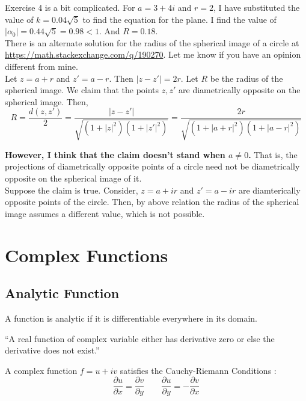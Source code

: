 \begin{commentary}
	Exercise 4 is a bit complicated.
	For $a = 3+4i$ and $r = 2$, I have substituted the value of $k = 0.04\sqrt{5}$ to find the equation for the plane.
	I find the value of $|\alpha_0| = 0.44\sqrt{5} = 0.98 < 1$.
	And $R = 0.18$. \\

	There is an alternate solution for the radius of the spherical image of a circle at \url{https://math.stackexchange.com/q/190270}.
	Let me know if you have an opinion different from mine.\\

	Let $z = a+r$ and $z' = a-r$.
	Then $|z-z'| = 2r$.
	Let $R$ be the radius of the spherical image.
	We claim that the points $z,z'$ are diametrically opposite on the spherical image.
	Then,
	\[ R = \frac{d(z,z')}{2} = \frac{|z-z'|}{\sqrt{(1+|z|^2)(1+|{z'}|^2)}} = \frac{2r}{\sqrt{(1+|a+r|^2)(1+|a-r|^2)}} \]

	\textbf{However, I think that the claim doesn't stand when $a \ne 0$.}
	That is, the projections of diametrically opposite points of a circle need not be diametrically opposite on the spherical image of it.\\

	Suppose the claim is true.
	Consider, $z = a+ir$ and $z'=a-ir$ are diamterically opposite points of the circle.
	Then, by above relation the radius of the spherical image assumes a different value, which is not possible.
	\end{commentary}

\section{Complex Functions}
\subsection{Analytic Function}
\begin{definition}[analytic]
	A function is analytic if it is differentiable everywhere in its domain.
\end{definition}

\begin{important}
	``A real function of complex variable either has derivative zero or else the derivative does not exist.''
\end{important}

\begin{definition}
A complex function $f = u+iv$ satisfies the Cauchy-Riemann Conditions :
\begin{equation}
	\frac{\partial u}{\partial x} = \frac{\partial v}{\partial y} \qquad \frac{\partial u}{\partial y} = -\frac{\partial v}{\partial x}
	\label{eqn:CR}
\end{equation}
\end{definition}

